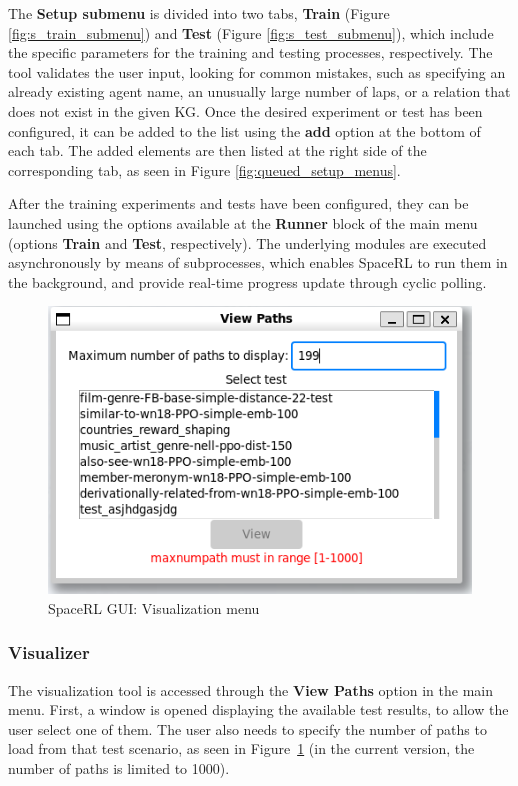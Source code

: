 The \textbf{Setup submenu} is divided into two tabs, \textbf{Train} (Figure \ref{fig:s_train_submenu}) and \textbf{Test} (Figure \ref{fig:s_test_submenu}), which include the specific parameters for the training and testing processes, respectively. The tool validates the user input, looking for common mistakes, such as specifying an already existing agent name, an unusually large number of laps, or a relation that does not exist in the given KG. Once the desired experiment or test has been configured, it can be added to the list using the \textbf{add} option at the bottom of each tab. The added elements are then listed at the right side of the corresponding tab, as seen in Figure \ref{fig:queued_setup_menus}.

After the training experiments and tests have been configured, they can be launched using the options available at the \textbf{Runner} block of the main menu (options \textbf{Train} and \textbf{Test}, respectively). The underlying modules are executed asynchronously by means of subprocesses, which enables SpaceRL to run them in the background, and provide real-time progress update through cyclic polling.

\begin{figure}[!h]
    \centering
    \includegraphics[width=0.47\columnwidth]{fig/framework/GUI/view_paths_menu_error}
    \caption{SpaceRL GUI: Visualization menu}
    \label{fig:view_paths_menu}
\end{figure}

\subsubsection{Visualizer}
The visualization tool is accessed through the \textbf{View Paths} option in the main menu. First, a window is opened displaying the available test results, to allow the user select one of them. The user also needs to specify the number of paths to load from that test scenario, as seen in Figure~\ref{fig:view_paths_menu} (in the current version, the number of paths is limited to 1000).

